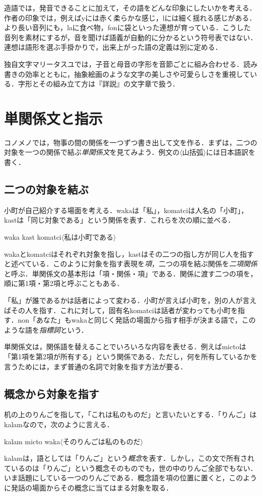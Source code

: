 \documentclass[b5paper, 10pt]{ltjsarticle}
\newcommand{\ko}[1]{\textsf{#1}}
\newcommand{\sentence}[1]{$\langle$#1$\rangle$}
\begin{document}
造語では，発音できることに加えて，その語をどんな印象にしたいかを考える．作者の印象では，例えば\ko{y}には赤く柔らかな感じ，\ko{l}には細く揺れる感じがある．より長い音列にも，\ko{la}に食べ物，\ko{fon}に袋といった連想が育っている．こうした音列を素材にするが，音を聞けば語義が自動的に分かるという符号表ではない．連想は語形を選ぶ手掛かりで，出来上がった語の定義は別に定める．

独自文字マリータスユでは，子音と母音の字形を音節ごとに組み合わせる．読み書きの効率とともに，抽象絵画のような文字の美しさや可愛らしさを重視している．字形とその組み立て方は『詳説』の文字章で扱う．

\section{単関係文と指示}
コノメノでは，物事の間の関係を一つずつ書き出して文を作る．まずは，二つの対象を一つの関係で結ぶ\emph{単関係文}を見てみよう．例文の\sentence{山括弧}には日本語訳を書く．

\subsection{二つの対象を結ぶ}
小町が自己紹介する場面を考える．\ko{waka}は「私」，\ko{komatci}は人名の「小町」，\ko{kast}は「同じ対象である」という関係を表す．これらを次の順に並べる．
\begin{exe}
    \ex \ko{waka kast komatci}\hfill \sentence{私は小町である}
\end{exe}
\ko{waka}と\ko{komatci}はそれぞれ対象を指し，\ko{kast}はその二つの指し方が同じ人を指すと述べている．このように対象を指す表現を\emph{項}，二つの項を結ぶ関係を\emph{二項関係}と呼ぶ．単関係文の基本形は「項・関係・項」である．関係に渡す二つの項を，順に第1項・第2項と呼ぶこともある．

「私」が誰であるかは話者によって変わる．小町が言えば小町を，別の人が言えばその人を指す．これに対して，固有名\ko{komatci}は話者が変わっても小町を指す．\ko{non}「あなた」も\ko{waka}と同じく発話の場面から指す相手が決まる語で，このような語を\emph{指標詞}という．

単関係文は，関係語を替えることでいろいろな内容を表せる．例えば\ko{micto}は「第1項を第2項が所有する」という関係である．ただし，何を所有しているかを言うためには，まず普通の名詞で対象を指す方法が要る．

\subsection{概念から対象を指す}
机の上のりんごを指して，「これは私のものだ」と言いたいとする．「りんご」は\ko{kalam}なので，次のように言える．
\begin{exe}
    \ex \ko{kalam micto waka}\hfill \sentence{そのりんごは私のものだ}
\end{exe}
\ko{kalam}は，語としては「りんご」という\emph{概念}を表す．しかし，この文で所有されているのは「りんご」という概念そのものでも，世の中のりんご全部でもない．いま話題にしている一つのりんごである．概念語を項の位置に置くと，このように発話の場面からその概念に当てはまる対象を取る．
\end{document}
